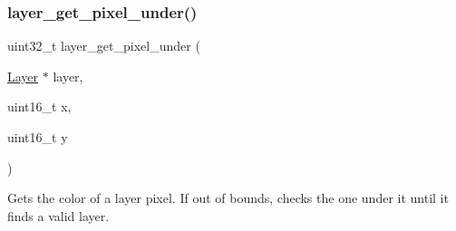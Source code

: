 \subsubsection{\texorpdfstring{layer\+\_\+get\+\_\+pixel\+\_\+under()}{layer\_get\_pixel\_under()}}
{\footnotesize\ttfamily uint32\+\_\+t layer\+\_\+get\+\_\+pixel\+\_\+under (\begin{DoxyParamCaption}\item[{\mbox{\hyperlink{struct_layer}{Layer}} $\ast$}]{layer,  }\item[{uint16\+\_\+t}]{x,  }\item[{uint16\+\_\+t}]{y }\end{DoxyParamCaption})}



Gets the color of a layer pixel. If out of bounds, checks the one under it until it finds a valid layer. 


